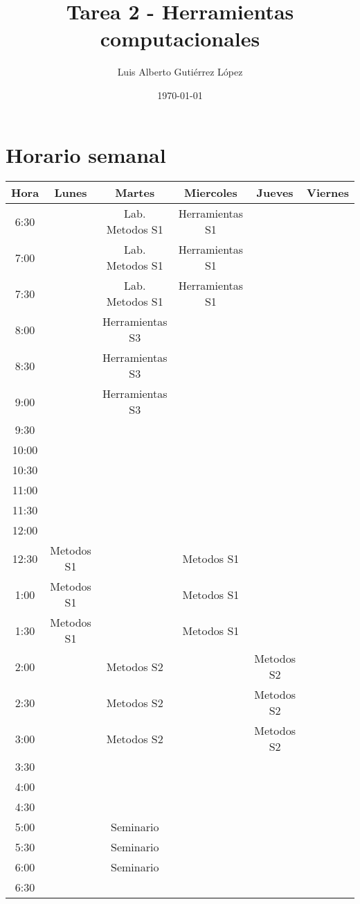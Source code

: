 \documentclass{article}
\author{Luis Alberto Guti\'errez L\'opez}
\date{\today}
\title{Tarea 2 - Herramientas computacionales}
\begin{document}
\maketitle

\section{Horario semanal}

\begin{tabular}{| c | c | c | c | c | c |}
\hline
Hora& Lunes & Martes & Miercoles & Jueves & Viernes \\
\hline
6:30  &  & Lab. Metodos S1 & Herramientas S1 &  &  \\
\hline
7:00  &  & Lab. Metodos S1 & Herramientas S1 &  &  \\
\hline
7:30  &  & Lab. Metodos S1 & Herramientas S1 &  &  \\
\hline
8:00  &  & Herramientas S3 &  &  &  \\
\hline
8:30  &  & Herramientas S3 &  &  &  \\
\hline
9:00  &  & Herramientas S3 &  &  &  \\
\hline
9:30  &  &  &  &  &  \\
\hline
10:00 &  &  &  &  &  \\
\hline
10:30 &  &  &  &  &  \\
\hline
11:00 &  &  &  &  &  \\
\hline
11:30 &  &  &  &  &  \\
\hline
12:00 &  &  &  &  &  \\
\hline
12:30 & Metodos S1 &  & Metodos S1 &  &  \\
\hline
1:00  & Metodos S1 &  & Metodos S1 &  &  \\
\hline
1:30  & Metodos S1 &  & Metodos S1 &  &  \\
\hline
2:00  &  & Metodos S2 &  & Metodos S2 &  \\
\hline
2:30  &  & Metodos S2 &  & Metodos S2 &  \\
\hline
3:00  &  & Metodos S2 &  & Metodos S2 &  \\
\hline
3:30  &  &  &  &  &  \\
\hline
4:00  &  &  &  &  &  \\
\hline
4:30  &  &  &  &  &  \\
\hline
5:00  &  & Seminario &  &  &  \\
\hline
5:30  &  & Seminario &  &  &  \\
\hline
6:00  &  & Seminario &  &  &  \\
\hline
6:30  &  &  &  &  &  \\
\hline
\end{tabular}
\end{document}
